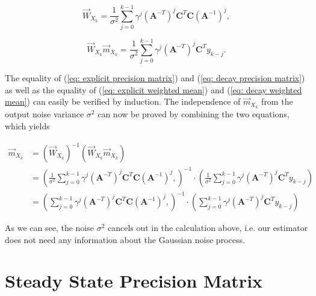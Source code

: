 \documentclass[11pt,a4paper,twoside]{report}
\newcommand{\messF}[3]{\overrightarrow{#1}_{{#2}_{k{#3}}}}
\newcommand{\mat}[1]{\mathbf{#1}}
\begin{document}
\begin{equation}
	\label{eq: explicit precision matrix}
	\messF{W}{X}{} = \frac{1}{\sigma^2}\sum_{j=0}^{k-1}\gamma^{j}\left(\mat{A}^{-T}\right)^j\mat{C}^T\mat{C}\left(\mat{A}^{-1}\right)^{j},
\end{equation}

\begin{equation}
	\label{eq: explicit weighted mean}
	\messF{W}{X}{}\messF{m}{X}{} = \frac{1}{\sigma^2}\sum_{j=0}^{k-1}\gamma^{j} \left(\mat{A}^{-T}\right)^j\mat{C}^T y_{k-j}.
\end{equation}

The equality of (\ref{eq: explicit precision matrix}) and (\ref{eq: decay precision matrix}) as well as the equality of (\ref{eq: explicit weighted mean}) and (\ref{eq: decay weighted mean}) can easily be verified by induction. The independence of $\messF{m}{X}{}$ from the output noise variance $\sigma^2$ can now be proved by combining the two equations, which yields

\begin{align}
	\label{eq mean independence}
	\messF{m}{X}{} &= \left( \messF{W}{X}{}\right)^{-1} \left(\messF{W}{X}{}\messF{m}{X}{}\right) \\
	&= \left(\frac{1}{\sigma^2} \sum_{j=0}^{k-1}\gamma^{j}\left(\mat{A}^{-T}\right)^j\mat{C}^T\mat{C}\left(\mat{A}^{-1}\right)^{j}, \right)^{-1} \cdot \left( \frac{1}{\sigma^2}\sum_{j=0}^{k-1}\gamma^{j} \left(\mat{A}^{-T}\right)^j\mat{C}^T y_{k-j} \right) \\
	&= \left(\sum_{j=0}^{k-1}\gamma^{j}\left(\mat{A}^{-T}\right)^j\mat{C}^T\mat{C}\left(\mat{A}^{-1}\right)^{j}, \right)^{-1} \cdot  \left(\sum_{j=0}^{k-1}\gamma^{j} \left(\mat{A}^{-T}\right)^j\mat{C}^T y_{k-j} \right)
\end{align}

As we can see, the noise $\sigma^2$ cancels out in the calculation above, i.e. our estimator does not need any information about the Gaussian noise process.



\chapter{Steady State Precision Matrix}

\end{document}
